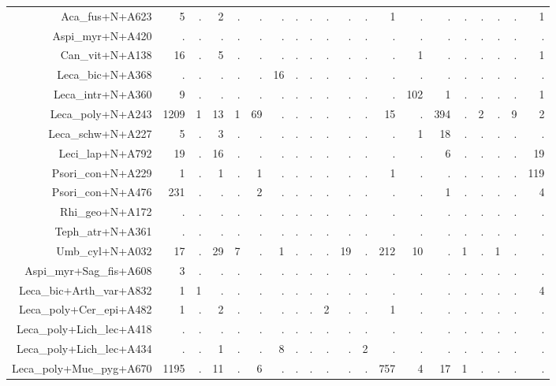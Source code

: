 \documentclass[a4paper, 11]{article}\usepackage[]{graphicx}\usepackage[]{color}
\begin{document}
\begin{table}
\begin{tabular}{rrrrrrrrrrrrrrrrrrrr}
  \hline
Aca\_fus+N+A623 & 5 & . & 2 & . & . & . & . & . & . & . & . & 1 & . & . & . & . & . & . & 1 \\ 
  Aspi\_myr+N+A420 & . & . & . & . & . & . & . & . & . & . & . & . & . & . & . & . & . & . & . \\ 
  Can\_vit+N+A138 & 16 & . & 5 & . & . & . & . & . & . & . & . & . & 1 & . & . & . & . & . & 1 \\ 
  Leca\_bic+N+A368 & . & . & . & . & . & 16 & . & . & . & . & . & . & . & . & . & . & . & . & . \\ 
  Leca\_intr+N+A360 & 9 & . & . & . & . & . & . & . & . & . & . & . & 102 & 1 & . & . & . & . & 1 \\ 
  Leca\_poly+N+A243 & 1209 & 1 & 13 & 1 & 69 & . & . & . & . & . & . & 15 & . & 394 & . & 2 & . & 9 & 2 \\ 
  Leca\_schw+N+A227 & 5 & . & 3 & . & . & . & . & . & . & . & . & . & 1 & 18 & . & . & . & . & . \\ 
  Leci\_lap+N+A792 & 19 & . & 16 & . & . & . & . & . & . & . & . & . & . & 6 & . & . & . & . & 19 \\ 
  Psori\_con+N+A229 & 1 & . & 1 & . & 1 & . & . & . & . & . & . & 1 & . & . & . & . & . & . & 119 \\ 
  Psori\_con+N+A476 & 231 & . & . & . & 2 & . & . & . & . & . & . & . & . & 1 & . & . & . & . & 4 \\ 
  Rhi\_geo+N+A172 & . & . & . & . & . & . & . & . & . & . & . & . & . & . & . & . & . & . & . \\ 
  Teph\_atr+N+A361 & . & . & . & . & . & . & . & . & . & . & . & . & . & . & . & . & . & . & . \\ 
  Umb\_cyl+N+A032 & 17 & . & 29 & 7 & . & 1 & . & . & . & 19 & . & 212 & 10 & . & 1 & . & 1 & . & . \\ 
  Aspi\_myr+Sag\_fis+A608 & 3 & . & . & . & . & . & . & . & . & . & . & . & . & . & . & . & . & . & . \\ 
  Leca\_bic+Arth\_var+A832 & 1 & 1 & . & . & . & . & . & . & . & . & . & . & . & . & . & . & . & . & 4 \\ 
  Leca\_poly+Cer\_epi+A482 & 1 & . & 2 & . & . & . & . & . & 2 & . & . & 1 & . & . & . & . & . & . & . \\ 
  Leca\_poly+Lich\_lec+A418 & . & . & . & . & . & . & . & . & . & . & . & . & . & . & . & . & . & . & . \\ 
  Leca\_poly+Lich\_lec+A434 & . & . & 1 & . & . & 8 & . & . & . & . & 2 & . & . & . & . & . & . & . & . \\ 
  Leca\_poly+Mue\_pyg+A670 & 1195 & . & 11 & . & 6 & . & . & . & . & . & . & 757 & 4 & 17 & 1 & . & . & . & . \\ 

\end{tabular}
\end{table}
\end{document}
